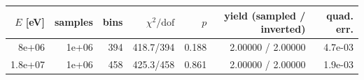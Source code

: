 \begin{tabular}{rrrrrrr}
\toprule
$E$ [eV] & samples & bins & $\chi^2/\mathrm{dof}$ & $p$ & yield (sampled / inverted) & quad. err. \\
\midrule
8e+06 & 1e+06 & 394 & 418.7/394 & 0.188 & 2.00000 / 2.00000 & 4.7e-03 \\
1.8e+07 & 1e+06 & 458 & 425.3/458 & 0.861 & 2.00000 / 2.00000 & 1.9e-03 \\
\bottomrule
\end{tabular}
